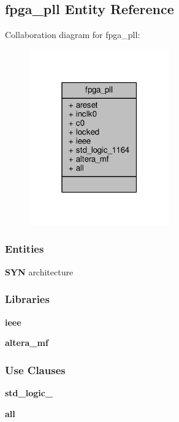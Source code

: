 \subsection{fpga\+\_\+pll Entity Reference}
\label{classfpga__pll}


Collaboration diagram for fpga\+\_\+pll\+:\nopagebreak
\begin{figure}[H]
\begin{center}
\leavevmode
\includegraphics[width=171pt]{d1/de2/classfpga__pll__coll__graph}
\end{center}
\end{figure}
\subsubsection*{Entities}
\begin{DoxyCompactItemize}
\item 
{\bf S\+YN} architecture
\end{DoxyCompactItemize}
\subsubsection*{Libraries}
 \begin{DoxyCompactItemize}
\item 
{\bf ieee} 
\item 
{\bf altera\+\_\+mf} 
\end{DoxyCompactItemize}
\subsubsection*{Use Clauses}
 \begin{DoxyCompactItemize}
\item 
{\bf std\+\_\+logic\+\_}   
\item 
{\bf  all }   
\end{DoxyCompactItemize}
